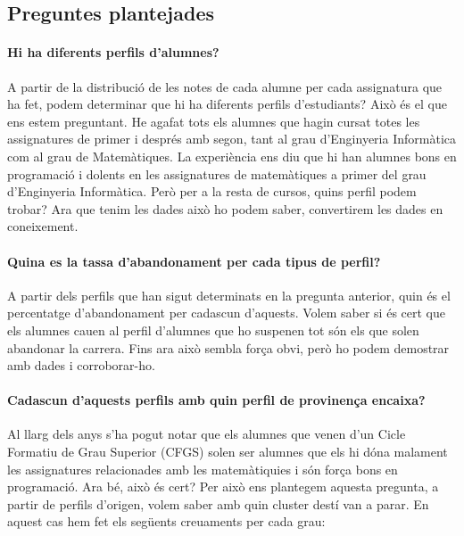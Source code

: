 \documentclass[12pt,a4paper,catalan]{article}
\begin{document}
\subsection{Preguntes plantejades} 
\paragraph{Hi ha diferents perfils d'alumnes?}
A partir de la distribució de les notes de cada alumne per cada assignatura que ha fet, podem determinar que hi ha diferents perfils d'estudiants? Això és el que ens estem preguntant. He agafat tots els alumnes que hagin cursat totes les assignatures de primer i després amb segon, tant al grau d'Enginyeria Informàtica com al grau de Matemàtiques. La experiència ens diu que hi han alumnes bons en programació i dolents en les assignatures de matemàtiques a primer del grau d'Enginyeria Informàtica. Però per a la resta de cursos, quins perfil podem trobar? Ara que tenim les dades això ho podem saber, convertirem les dades en coneixement.

\paragraph{Quina es la tassa d'abandonament per cada tipus de perfil?}
A partir dels perfils que han sigut determinats en la pregunta anterior, quin és el percentatge d'abandonament per cadascun d'aquests. Volem saber si és cert que els alumnes cauen al perfil d'alumnes que ho suspenen tot són els que solen abandonar la carrera. Fins ara això sembla força obvi, però ho podem demostrar amb dades i corroborar-ho.

\paragraph{Cadascun d'aquests perfils amb quin perfil de provinença encaixa?}
Al llarg dels anys s'ha pogut notar que els alumnes que venen d'un Cicle Formatiu de Grau Superior (CFGS) solen ser alumnes que els hi dóna malament les assignatures relacionades amb les matemàtiquies i són força bons en programació. Ara bé, això és cert? Per això ens plantegem aquesta pregunta, a partir de perfils d'origen, volem saber amb quin cluster destí van a parar. En aquest cas hem fet els següents creuaments per cada grau:
\end{document}
